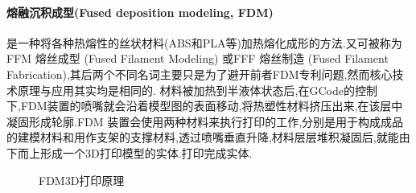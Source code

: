 \documentclass[a4paper,12pt,onecolumn,twoside]{article}
\begin{document}
\paragraph{熔融沉积成型(Fused deposition modeling, FDM)}
是一种将各种热熔性的丝状材料(ABS和PLA等)加热熔化成形的方法.又可被称为FFM 熔丝成型 (Fused Filament Modeling) 或FFF 熔丝制造 (Fused Filament Fabrication),其后两个不同名词主要只是为了避开前者FDM专利问题,然而核心技术原理与应用其实均是相同的.
材料被加热到半液体状态后,在GCode的控制下,FDM装置的喷嘴就会沿着模型图的表面移动,将热塑性材料挤压出来,在该层中凝固形成轮廓.FDM 装置会使用两种材料来执行打印的工作,分别是用于构成成品的建模材料和用作支架的支撑材料,透过喷嘴垂直升降,材料层层堆积凝固后,就能由下而上形成一个3D打印模型的实体.打印完成实体.
\begin{figure}[htbp]
\centering
{}
\caption{FDM3D打印原理}
\end{figure}
\end{document}
